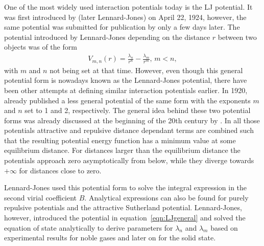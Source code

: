 One of the most widely used interaction potentials today is the \ac{LJ}
potential. It was first introduced by
\citeauthor{Jones_DeterminationMolecularFields_1924} (later Lennard-Jones) on
April 22, 1924\autocite{Jones_DeterminationMolecularFields_1924}, however, the
same potential was submitted for publication by
\citeauthor{Simon_KristallstrukturArgons_1924} only a few days
later.\autocite{Simon_KristallstrukturArgons_1924} The potential introduced by
Lennard-Jones depending on the distance $r$ between two objects was of the form
%
\begin{align}
    V_{m,n}(r)=\frac{\lambda_n}{r^n}-\frac{\lambda_m}{r^m},\, m<n,\label{eqn:LJgeneral}
\end{align}
%
with $m$ and $n$ not being set at that time. However, even though this general
potential form is nowadays known as the Lennard-Jones potential, there have
been other attempts at defining similar interaction
potentials earlier. In 1920,
\citeauthor{Kratzer_ultrarotenRotationsspektrenHalogenwasserstoffe_1920}\autocite{Kratzer_ultrarotenRotationsspektrenHalogenwasserstoffe_1920}
already published a less general potential of the same form with the exponents
$m$ and $n$ set to 1 and 2, respectively. The general idea behind these two
potential forms was already discussed at the beginning of the 20th century by
\citeauthor{Mie_ZurkinetischenTheorie_1903}\autocite{Mie_ZurkinetischenTheorie_1903}.
In all those potentials attractive and repulsive distance dependant terms are
combined such that the resulting potential energy function has a minimum value
at some equilibrium distance. For distances larger than the equilibrium
distance the potentials approach zero asymptotically from below, while they
diverge towards $+\infty$ for distances close to zero.

Lennard-Jones used this potential form to solve the integral expression in the
second virial coefficient $B$. Analytical expressions can also be found for
purely repulsive potentials and the attractive Sutherland potential.
Lennard-Jones, however, introduced the potential in
equation~\ref{eqn:LJgeneral} and solved the equation of state analytically to
derive parameters for $\lambda_n$ and $\lambda_m$ based on experimental results
for noble gases\autocite{Jones_DeterminationMolecularFields_1924} and later on
for the solid state.\autocite{Jones_calculationcertaincrystal_1925}

